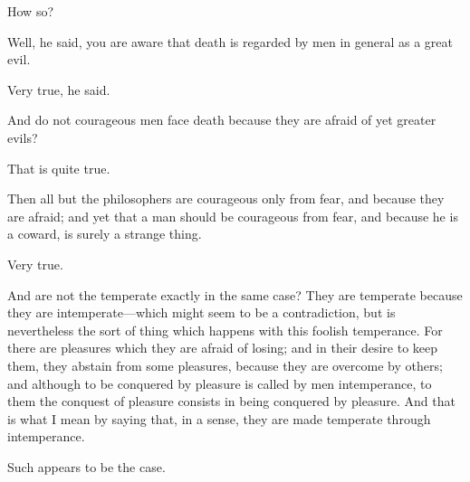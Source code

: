 \documentclass[11pt,letter]{article}
\begin{document}
\par  How so?

\par  Well, he said, you are aware that death is regarded by men in general as a great evil.

\par  Very true, he said.

\par  And do not courageous men face death because they are afraid of yet greater evils?

\par  That is quite true.

\par  Then all but the philosophers are courageous only from fear, and because they are afraid; and yet that a man should be courageous from fear, and because he is a coward, is surely a strange thing.

\par  Very true.

\par  And are not the temperate exactly in the same case? They are temperate because they are intemperate—which might seem to be a contradiction, but is nevertheless the sort of thing which happens with this foolish temperance. For there are pleasures which they are afraid of losing; and in their desire to keep them, they abstain from some pleasures, because they are overcome by others; and although to be conquered by pleasure is called by men intemperance, to them the conquest of pleasure consists in being conquered by pleasure. And that is what I mean by saying that, in a sense, they are made temperate through intemperance.

\par  Such appears to be the case.
\end{document}

